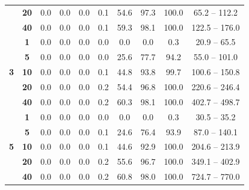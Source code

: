 \documentclass[a4paper, 12pt]{article}
\begin{document}
\begin{table}[h]
{\begin{tabular}{cc ccccccc c}
         & \textbf{20} & 0.0 & 0.0 & 0.0 & 0.1 & 54.6 & 97.3 & 100.0 & 65.2 -- 112.2 \\
         & \textbf{40} & 0.0 & 0.0 & 0.0 & 0.1 & 59.3 & 98.1 & 100.0 & 122.5 -- 176.0 \\
        \midrule
        \multirow{5}{*}{\textbf{3}} 
         & \textbf{1}  & 0.0 & 0.0 & 0.0 & 0.0 & 0.0 & 0.0 & 0.3 & 20.9 -- 65.5 \\
         & \textbf{5}  & 0.0 & 0.0 & 0.0 & 0.0 & 25.6 & 77.7 & 94.2 & 55.0 -- 101.0 \\
         & \textbf{10} & 0.0 & 0.0 & 0.0 & 0.1 & 44.8 & 93.8 & 99.7 & 100.6 -- 150.8 \\
         & \textbf{20} & 0.0 & 0.0 & 0.0 & 0.2 & 54.4 & 96.8 & 100.0 & 220.6 -- 246.4 \\
         & \textbf{40} & 0.0 & 0.0 & 0.0 & 0.2 & 60.3 & 98.1 & 100.0 & 402.7 -- 498.7 \\
        \midrule
        \multirow{5}{*}{\textbf{5}} 
         & \textbf{1}  & 0.0 & 0.0 & 0.0 & 0.0 & 0.0 & 0.0 & 0.3 & 30.5 -- 35.2 \\
         & \textbf{5}  & 0.0 & 0.0 & 0.0 & 0.1 & 24.6 & 76.4 & 93.9 & 87.0 -- 140.1 \\
         & \textbf{10} & 0.0 & 0.0 & 0.0 & 0.1 & 44.6 & 92.9 & 100.0 & 204.6 -- 213.9 \\
         & \textbf{20} & 0.0 & 0.0 & 0.0 & 0.2 & 55.6 & 96.7 & 100.0 & 349.1 -- 402.9 \\
         & \textbf{40} & 0.0 & 0.0 & 0.0 & 0.2 & 60.8 & 98.0 & 100.0 & 724.7 -- 770.0 \\
        \bottomrule
    \end{tabular}
    } 
\end{table}
\end{document}
